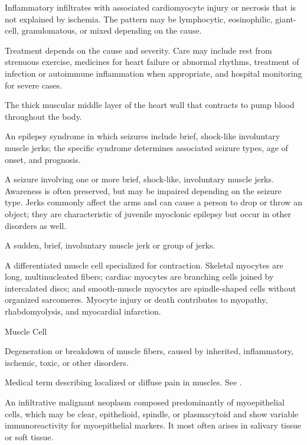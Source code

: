  Inflammatory infiltrates with associated cardiomyocyte injury or necrosis that is not explained by ischemia. The pattern may be lymphocytic, eosinophilic, giant-cell, granulomatous, or mixed depending on the cause.

 Treatment depends on the cause and severity. Care may include rest from strenuous exercise, medicines for heart failure or abnormal rhythms, treatment of infection or autoimmune inflammation when appropriate, and hospital monitoring for severe cases.

 The thick muscular middle layer of the heart wall that contracts to pump blood throughout the body.

 An epilepsy syndrome in which seizures include brief, shock-like involuntary muscle jerks; the specific syndrome determines associated seizure types, age of onset, and prognosis.

 A seizure involving one or more brief, shock-like, involuntary muscle jerks. Awareness is often preserved, but may be impaired depending on the seizure type. Jerks commonly affect the arms and can cause a person to drop or throw an object; they are characteristic of juvenile myoclonic epilepsy but occur in other disorders as well.

 A sudden, brief, involuntary muscle jerk or group of jerks.

 A differentiated muscle cell specialized for contraction. Skeletal myocytes are long, multinucleated fibers; cardiac myocytes are branching cells joined by intercalated discs; and smooth-muscle myocytes are spindle-shaped cells without organized sarcomeres. Myocyte injury or death contributes to myopathy, rhabdomyolysis, and myocardial infarction.

\synonyms
Muscle Cell

 Degeneration or breakdown of muscle fibers, caused by inherited, inflammatory, ischemic, toxic, or other disorders.

 Medical term describing localized or diffuse pain in muscles. See .

 An infiltrative malignant neoplasm composed predominantly of myoepithelial cells, which may be clear, epithelioid, spindle, or plasmacytoid and show variable immunoreactivity for myoepithelial markers. It most often arises in salivary tissue or soft tissue.

